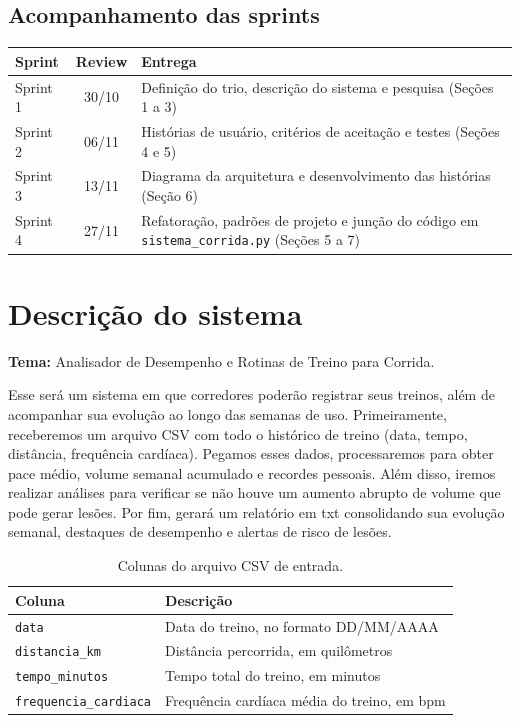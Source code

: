 \documentclass[12pt,a4paper]{article}
\begin{document}
\subsection{Acompanhamento das sprints}

\begin{table}[H]
  \centering
  \begin{tabularx}{\linewidth}{l c X}
    \toprule
    \textbf{Sprint} & \textbf{Review} & \textbf{Entrega} \\
    \midrule
    Sprint 1 & 30/10 & Definição do trio, descrição do sistema e pesquisa (Seções 1 a 3) \\
    Sprint 2 & 06/11 & Histórias de usuário, critérios de aceitação e testes (Seções 4 e 5) \\
    Sprint 3 & 13/11 & Diagrama da arquitetura e desenvolvimento das histórias (Seção 6) \\
    Sprint 4 & 27/11 & Refatoração, padrões de projeto e junção do código em \texttt{sistema\_corrida.py} (Seções 5 a 7) \\
    \bottomrule
  \end{tabularx}
\end{table}

\section{Descrição do sistema}

\noindent\textbf{Tema:} Analisador de Desempenho e Rotinas de Treino para Corrida.

Esse será um sistema em que corredores poderão registrar seus treinos, além de
acompanhar sua evolução ao longo das semanas de uso. Primeiramente, receberemos um
arquivo CSV com todo o histórico de treino (data, tempo, distância, frequência
cardíaca). Pegamos esses dados, processaremos para obter pace médio, volume semanal
acumulado e recordes pessoais. Além disso, iremos realizar análises para verificar se
não houve um aumento abrupto de volume que pode gerar lesões. Por fim, gerará um
relatório em txt consolidando sua evolução semanal, destaques de desempenho e alertas
de risco de lesões.

\begin{table}[H]
  \centering
  \caption{Colunas do arquivo CSV de entrada.}
  \label{tab:csv}
  \begin{tabularx}{\linewidth}{l X}
    \toprule
    \textbf{Coluna} & \textbf{Descrição} \\
    \midrule
    \texttt{data}                 & Data do treino, no formato DD/MM/AAAA \\
    \texttt{distancia\_km}        & Distância percorrida, em quilômetros \\
    \texttt{tempo\_minutos}       & Tempo total do treino, em minutos \\
    \texttt{frequencia\_cardiaca} & Frequência cardíaca média do treino, em bpm \\
    \bottomrule
  \end{tabularx}
\end{table}
\end{document}
